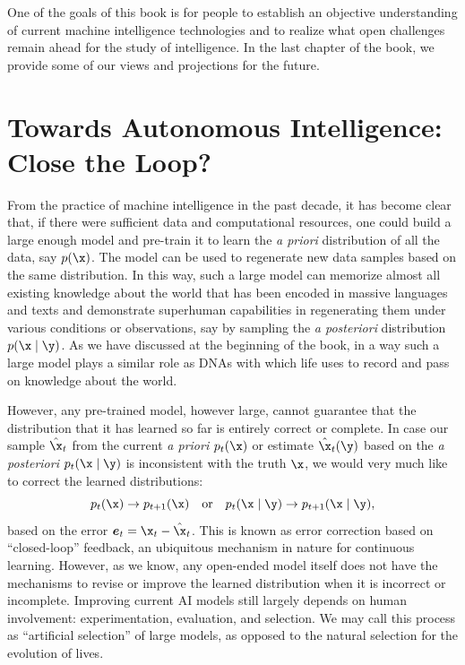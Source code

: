 \documentclass[../../book-main.tex]{subfiles}
\begin{document}
One of the goals of this book is for people to establish an objective understanding of current machine intelligence technologies and to realize what open challenges remain ahead for the study of intelligence. In the last chapter of the book, we provide some of our views and projections for the future. 

\section{Towards Autonomous Intelligence: Close the Loop?}
From the practice of machine intelligence in the past decade, it has become clear that, if there were sufficient data and computational resources, one could build a large enough model and pre-train it to learn the {\em a priori} distribution of all the data, say $p(\x)$. The model can be used to regenerate new data samples based on the same distribution. In this way, such a large model can memorize almost all existing knowledge about the world that has been encoded in massive languages and texts and demonstrate superhuman capabilities in regenerating them under various conditions or observations, say by sampling the {\em a posteriori} distribution $p(\x\mid \y)$. As we have discussed at the beginning of the book, in a way such a large model plays a similar role as DNAs with which life uses to record and pass on knowledge about the world.   

However, any pre-trained model, however large, cannot guarantee that the distribution that it has learned so far is entirely correct or complete. In case our sample $\hat{\x}_t$ from the current {\em a priori} $p_t(\x)$ or estimate $\hat{\x}_t(\y)$ based on the {\em a posteriori} $p_t(\x\mid \y)$ is inconsistent with the truth $\x$, we would very much like to correct the learned distributions:
\begin{equation}
    p_t(\x) \rightarrow p_{t+1}(\x) \quad \mbox{or}\quad p_t(\x\mid \y) \rightarrow p_{t+1}(\x\mid \y),
\end{equation}
based on the error $\boldsymbol{e}_t = \x_t - \hat{\x}_t$. This is known as error correction based on ``closed-loop'' feedback, an ubiquitous mechanism in nature for continuous learning. However, as we know, any open-ended model itself does not have the mechanisms to revise or improve the learned distribution when it is incorrect or incomplete. Improving current AI models still largely depends on human involvement: experimentation, evaluation, and selection. We may call this process as ``artificial selection'' of large models, as opposed to the natural selection for the evolution of lives. 
\end{document}
